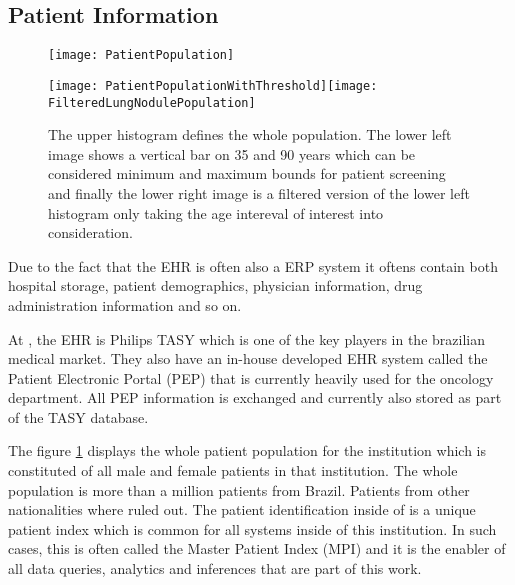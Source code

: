 \subsection{Patient Information}

\label{sec:ehr_patient_information}
\begin{center}
\begin{figure}
\begin{centering}
\texttt{[image: PatientPopulation]}
\par\end{centering}
\begin{centering}
\texttt{[image: PatientPopulationWithThreshold]}\texttt{[image: FilteredLungNodulePopulation]}
\end{centering}
\caption{\label{fig:patient_population}The upper histogram defines the whole \nomeHsl{} population. The lower left image shows a vertical bar on 35 and 90 years which can
be considered minimum and maximum bounds for patient screening and
finally the lower right image is a filtered version of the lower left
histogram only taking the age intereval of interest into consideration.}
\end{figure}
\vspace*{-38pt}
\end{center}

Due to the fact that the EHR is often also a ERP system it oftens contain both hospital storage, patient demographics, physician information, drug administration information and so on. 

At \nomeHsl{}, the EHR is Philips TASY which is one of the key players in the brazilian medical market. They also have an in-house developed EHR system called the Patient Electronic Portal (PEP) that is currently heavily used for the oncology department. All PEP information is exchanged and currently also stored as part of the TASY database.

The figure \ref{fig:patient_population} displays the whole patient population for the institution which is constituted of all male and female patients in that institution. The whole population is more than a million patients from Brazil. Patients from other nationalities where ruled out. The patient identification inside of \nomeHslShort{} is a unique patient index which is common for all systems inside of this institution. In such cases, this is often called the Master Patient Index (MPI) and it is the enabler of all data queries, analytics and inferences that are part of this work.

